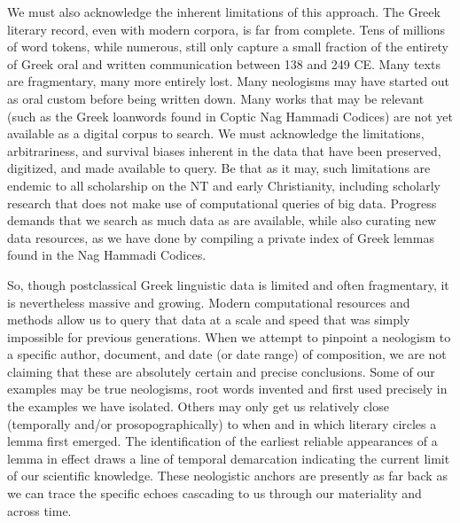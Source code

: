 We must also acknowledge the inherent limitations of this approach. %
The Greek literary record, even with modern corpora, %
is far from complete. Tens of millions of word tokens, while numerous, %
still only capture a small fraction of the entirety %
of Greek oral and written communication between 138 and 249 CE. %
Many texts are fragmentary, many more entirely lost. %
Many neologisms may have started out as oral custom before being written down. %
Many works that may be relevant (such as the Greek loanwords found in Coptic Nag Hammadi Codices) %
are not yet available as a digital corpus to search. %
We must acknowledge the limitations, arbitrariness, %
and survival biases inherent in the data that have been preserved, digitized, and made available to query. %
Be that as it may, such limitations are endemic to all scholarship on the NT and early Christianity, %
including scholarly research that does not make use of computational queries of big data. %
Progress demands that we search as much data as are available, %
while also curating new data resources, %
as we have done by compiling a private index of Greek lemmas found in the Nag Hammadi Codices. %

So, though postclassical Greek linguistic data is limited and often fragmentary, %
it is nevertheless massive and growing. %
Modern computational resources and methods allow us to query that data %
at a scale and speed that was simply impossible for previous generations. %
When we attempt to pinpoint a neologism to a specific author, document, %
and date (or date range) of composition, %
we are not claiming that these are absolutely certain and precise conclusions. %
Some of our examples may be true neologisms, %
root words invented and first used precisely in the examples we have isolated. %
Others may only get us relatively close (temporally and/or prosopographically) %
to when and in which literary circles a lemma first emerged. %
The identification of the earliest reliable appearances of a lemma %
in effect draws a line of temporal demarcation indicating the current limit of our scientific knowledge. %
These neologistic anchors are presently as far back as we can trace the specific echoes %
cascading to us through our materiality and across time.

